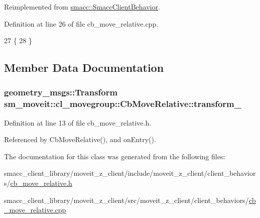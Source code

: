 Reimplemented from \hyperlink{classsmacc_1_1SmaccClientBehavior_ac0cd72d42bd00425362a97c9803ecce5}{smacc\+::\+Smacc\+Client\+Behavior}.



Definition at line 26 of file cb\+\_\+move\+\_\+relative.\+cpp.


\begin{DoxyCode}
27 \{
28 \}
\end{DoxyCode}


\subsection{Member Data Documentation}
\subsubsection[{\texorpdfstring{transform\+\_\+}{transform_}}]{\setlength{\rightskip}{0pt plus 5cm}geometry\+\_\+msgs\+::\+Transform sm\+\_\+moveit\+::cl\+\_\+movegroup\+::\+Cb\+Move\+Relative\+::transform\+\_\+}\hypertarget{classsm__moveit_1_1cl__movegroup_1_1CbMoveRelative_ac0f70c737faaaeb5e63aa2a4f727d30e}{}\label{classsm__moveit_1_1cl__movegroup_1_1CbMoveRelative_ac0f70c737faaaeb5e63aa2a4f727d30e}


Definition at line 13 of file cb\+\_\+move\+\_\+relative.\+h.



Referenced by Cb\+Move\+Relative(), and on\+Entry().



The documentation for this class was generated from the following files\+:\begin{DoxyCompactItemize}
\item 
smacc\+\_\+client\+\_\+library/moveit\+\_\+z\+\_\+client/include/moveit\+\_\+z\+\_\+client/client\+\_\+behaviors/\hyperlink{cb__move__relative_8h}{cb\+\_\+move\+\_\+relative.\+h}\item 
smacc\+\_\+client\+\_\+library/moveit\+\_\+z\+\_\+client/src/moveit\+\_\+z\+\_\+client/client\+\_\+behaviors/\hyperlink{cb__move__relative_8cpp}{cb\+\_\+move\+\_\+relative.\+cpp}\end{DoxyCompactItemize}
